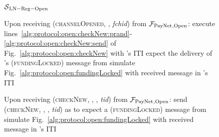 \begin{figure}[H]
\begin{simulatorbox}{$\mathcal{S}{}_{\mathrm{LN - Reg - Open}}$}
\begin{algorithmic}[1]
        \State Upon receiving (\textsc{channelOpened}, \alice, \textit{fchid})
        from $\mathcal{F}_{\mathrm{PayNet}}{}_{\mathrm{, Open}}$:
        \Indent
          \State execute
          lines~\ref{alg:protocol:open:checkNew:prand}-\ref{alg:protocol:open:checkNew:send}
          of Fig.~\ref{alg:protocol:open:checkNew} with \alice's ITI
            \State expect the delivery of \alice's (\textsc{fundingLocked})
            message from \adversary
            \State simulate Fig.~\ref{alg:protocol:open:fundingLocked} with
            received message in \bob's ITI
          \EndIf
        \EndIndent
        \Statex

        \State Upon receiving (\textsc{checkNew}, \alice, \bob, \textit{tid})
        from $\mathcal{F}_{\mathrm{PayNet}}{}_{\mathrm{, Open}}$: 
        \Indent
          \State send (\textsc{checkNew}, \alice, \bob, \textit{tid}) as
          \environment{} to \adversary
            \State expect a (\textsc{fundingLocked}) message from \adversary
            \State simulate Fig.~\ref{alg:protocol:open:fundingLocked} with
            received message in \bob's ITI
          \EndIf
        \EndIndent
      \end{algorithmic}
    \end{simulatorbox}
    \caption{}
    \label{alg:sim:open}
  \end{figure}
